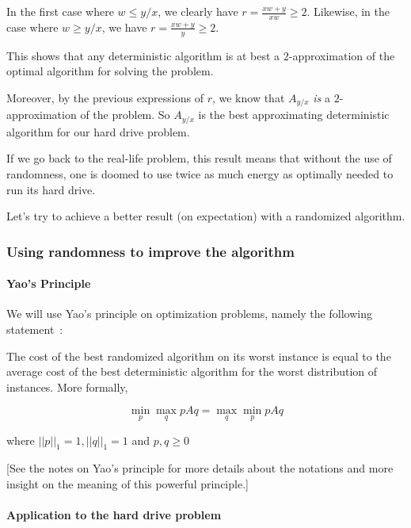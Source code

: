 In the first case where $w \leq y/x$, we clearly have $r = \frac{x w + y}{x w} \geq 2$. Likewise, in the case where $w \geq y/x$, we have $r = \frac{x w + y}{y} \geq 2$.

This shows that any deterministic algorithm is at best a $2$-approximation of the optimal algorithm for solving the problem.

\smallskip

Moreover, by the previous expressions of $r$, we know that $A_{y/x}$ \emph{is} a $2$-approximation of the problem. So $A_{y/x}$ is the best approximating deterministic algorithm for our hard drive problem.

\medskip

If we go back to the real-life problem, this result means that without the use of randomness, one is doomed to use twice as much energy as optimally needed to run its hard drive.

Let's try to achieve a better result (on expectation) with a randomized algorithm.



\subsubsection{Using randomness to improve the algorithm}

\paragraph{Yao's Principle}

We will use Yao's principle on optimization problems, namely the following statement~:

\begin{theorem}
The cost of the best randomized algorithm on its worst instance is equal to the average cost of the best deterministic algorithm for the worst distribution of instances. More formally, 

\[ \min_p \max_q p A q = \max_q \min_p p A q\]

where $||p||_1=1, ||q||_1=1$ and $p,q \geq 0$
\end{theorem}

[See the notes on Yao's principle for more details about the notations and more insight on the meaning of this powerful principle.]


\paragraph{Application to the hard drive problem}

